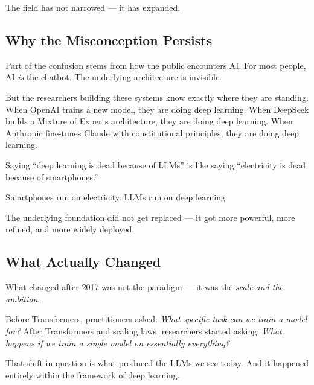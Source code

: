 The field has not narrowed --- it has expanded.

\subsection{Why the Misconception Persists}

Part of the confusion stems from how the public encounters AI.
For most people, AI \emph{is} the chatbot.
The underlying architecture is invisible.

But the researchers building these systems know exactly where they are standing.
When OpenAI trains a new model, they are doing deep learning.
When DeepSeek builds a Mixture of Experts architecture, they are doing deep learning.
When Anthropic fine-tunes Claude with constitutional principles, they are doing deep learning.

\begin{tcolorbox}[colback=green!5!white, colframe=green!40!black, title=A Useful Analogy]
Saying ``deep learning is dead because of LLMs'' is like saying ``electricity is dead because of smartphones.''

Smartphones run on electricity.
LLMs run on deep learning.

The underlying foundation did not get replaced --- it got more powerful, more refined, and more widely deployed.
\end{tcolorbox}

\subsection{What Actually Changed}

What changed after 2017 was not the paradigm --- it was the \emph{scale and the ambition}.

Before Transformers, practitioners asked: \emph{What specific task can we train a model for?}
After Transformers and scaling laws, researchers started asking: \emph{What happens if we train a single model on essentially everything?}

That shift in question is what produced the LLMs we see today.
And it happened entirely within the framework of deep learning.
